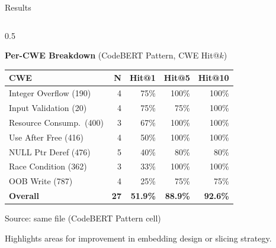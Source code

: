 \documentclass[aspectratio=169,10pt]{beamer}
\newcommand{\chit}[1]{\cellcolor{hit!30} #1}
\newcommand{\cmiss}[1]{\cellcolor{miss!25} #1}
\newcommand{\cwarn}[1]{\cellcolor{warn!30} #1}
\begin{document}
\begin{frame}{Results}
\begin{columns}[T]
\begin{column}{0.5\textwidth}
  \begin{center}
  {\small\textbf{Per-CWE Breakdown} {\scriptsize(CodeBERT Pattern, CWE Hit@$k$)}}\\[6pt]
  {\scriptsize
  \renewcommand{\arraystretch}{1.35}
  \setlength{\tabcolsep}{3.5pt}
  \begin{tabular}{l r rrr}
    \toprule
    \textbf{CWE} & \textbf{N} & \textbf{Hit@1} & \textbf{Hit@5} & \textbf{Hit@10} \\
    \midrule
    Integer Overflow (190) & 4 & \chit{75\%} & 100\% & 100\% \\
    Input Validation (20) & 4 & \chit{75\%} & 75\% & 100\% \\
    Resource Consump.\ (400) & 3 & \chit{67\%} & 100\% & 100\% \\
    Use After Free (416) & 4 & 50\% & 100\% & 100\% \\
    NULL Ptr Deref (476) & 5 & \cwarn{40\%} & 80\% & 80\% \\
    Race Condition (362) & 3 & \cwarn{33\%} & 100\% & 100\% \\
    OOB Write (787) & 4 & \cmiss{25\%} & 75\% & 75\% \\
    \midrule
    \textbf{Overall} & \textbf{27} & \textbf{51.9\%} & \textbf{88.9\%} & \textbf{92.6\%} \\
    \bottomrule
  \end{tabular}}

  \vspace{0.2em}
  {\tiny\textcolor{notecol}{Source: same file (CodeBERT Pattern cell)}}

  \vspace{0.2em}
  {\scriptsize\textcolor{notecol}{Highlights areas for improvement in embedding design or slicing strategy.}}
  \end{center}
    \end{column}
  \end{columns}
\end{frame}
\end{document}
